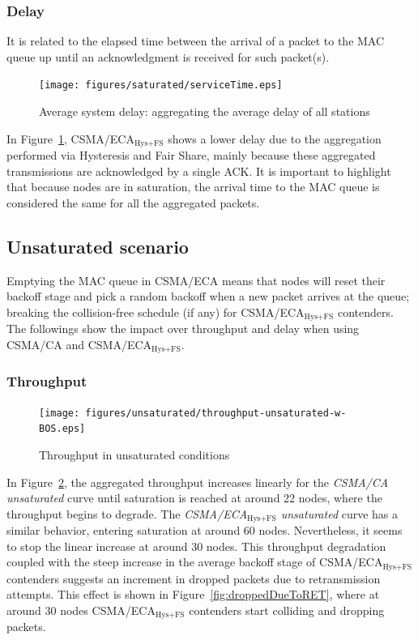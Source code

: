 \documentclass[a4paper,journal]{IEEEtran}
\begin{document}
	\subsubsection{Delay}
	
	It is related to the elapsed time between the arrival of a packet to the MAC queue up until an acknowledgment is received for such packet(s).

	\begin{figure}[tb]
		\centering
		\texttt{[image: figures/saturated/serviceTime.eps]}
		\caption{Average system delay: aggregating the average delay of all stations}
		\label{fig:serviceTime-sat}
	\end{figure}
	
	In Figure~\ref{fig:serviceTime-sat}, CSMA/ECA$_{\text{Hys+FS}}$ shows a lower delay due to the aggregation performed via Hysteresis and Fair Share, mainly because these aggregated transmissions are acknowledged by a single ACK. It is important to highlight that because nodes are in saturation, the arrival time to the MAC queue is considered the same for all the aggregated packets.

	\subsection{Unsaturated scenario}\label{resultsUnsaturated}
	Emptying the MAC queue in CSMA/ECA means that nodes will reset their backoff stage and pick a random backoff when a new packet arrives at the queue; breaking the collision-free schedule (if any)  for CSMA/ECA$_{\text{Hys+FS}}$ contenders. The followings show the impact over throughput and delay when using CSMA/CA and CSMA/ECA$_{\text{Hys+FS}}$.\\
	
	\subsubsection{Throughput}
	
   	\begin{figure}[tb]
		\centering
		\texttt{[image: figures/unsaturated/throughput-unsaturated-w-BOS.eps]}
		\caption{Throughput in unsaturated conditions}
		\label{fig:throughputUnsat}
	\end{figure}
	
	In Figure~\ref{fig:throughputUnsat}, the aggregated throughput increases linearly for the \emph{CSMA/CA unsaturated} curve until saturation is reached at around 22 nodes, where the throughput begins to degrade. The \emph{CSMA/ECA$_{\text{Hys+FS}}$ unsaturated} curve has a similar behavior, entering saturation at around 60 nodes. Nevertheless, it seems to stop the linear increase at around 30 nodes. This throughput degradation coupled with the steep increase in the average backoff stage of CSMA/ECA$_{\text{Hys+FS}}$ contenders suggests an increment in dropped packets due to retransmission attempts. This effect is shown in Figure~\ref{fig:droppedDueToRET}, where at around 30 nodes CSMA/ECA$_{\text{Hys+FS}}$ contenders start colliding and dropping packets. 
	
\end{document}
